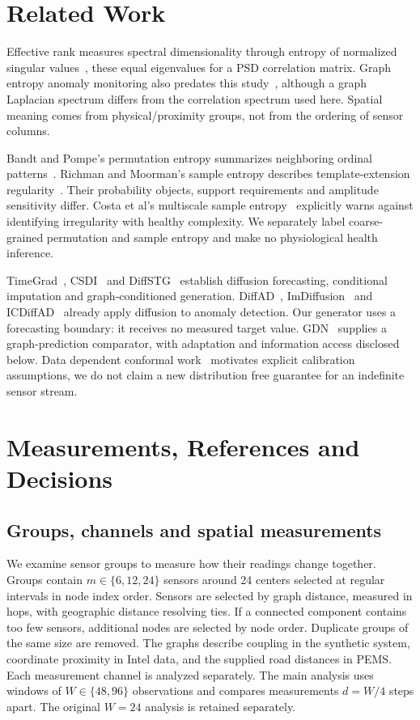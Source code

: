 \documentclass{llncs}
\begin{document}
\section{Related Work}
Effective rank measures spectral dimensionality through entropy of normalized
singular values~\cite{effective_rank}, these equal eigenvalues for a PSD
correlation matrix. Graph entropy anomaly monitoring also predates this
study~\cite{finger}, although a graph Laplacian spectrum differs from the
correlation spectrum used here. Spatial meaning comes from physical/proximity
groups, not from the ordering of sensor columns.

Bandt and Pompe's permutation entropy summarizes neighboring ordinal
patterns~\cite{bandt2002}. Richman and Moorman's sample entropy describes
template-extension regularity~\cite{richman2000}. Their probability objects,
support requirements and amplitude sensitivity differ. Costa et al's
multiscale sample entropy~\cite{costa2002} explicitly warns against identifying
irregularity with healthy complexity. We separately label coarse-grained
permutation and sample entropy and make no physiological health inference.

TimeGrad~\cite{timegrad}, CSDI~\cite{csdi} and DiffSTG~\cite{diffstg} establish
diffusion forecasting, conditional imputation and graph-conditioned generation.
DiffAD~\cite{diffad}, ImDiffusion~\cite{imdiffusion} and
ICDiffAD~\cite{icdiffad} already apply diffusion to anomaly detection. Our
generator uses a forecasting boundary: it receives no measured target value.
GDN~\cite{gdn} supplies a graph-prediction comparator, with adaptation and
information access disclosed below. Data dependent conformal
work~\cite{conformal} motivates explicit calibration assumptions, we do not
claim a new distribution free guarantee for an indefinite sensor stream.




\section{Measurements, References and Decisions}



\subsection{Groups, channels and spatial measurements}
We examine sensor groups to measure how their readings change together.
Groups contain $m\in\{6,12,24\}$ sensors around 24 centers selected at
regular intervals in node index order. Sensors are selected by graph
distance, measured in hops, with geographic distance resolving ties.
If a connected component contains too few sensors, additional nodes are
selected by node order. Duplicate groups of the same size are removed.
The graphs describe coupling in the synthetic system, coordinate proximity
in Intel data, and the supplied road distances in PEMS. Each measurement
channel is analyzed separately. The main analysis uses windows of
$W\in\{48,96\}$ observations and compares measurements $d=W/4$ steps
apart. The original $W=24$ analysis is retained separately.
\end{document}
